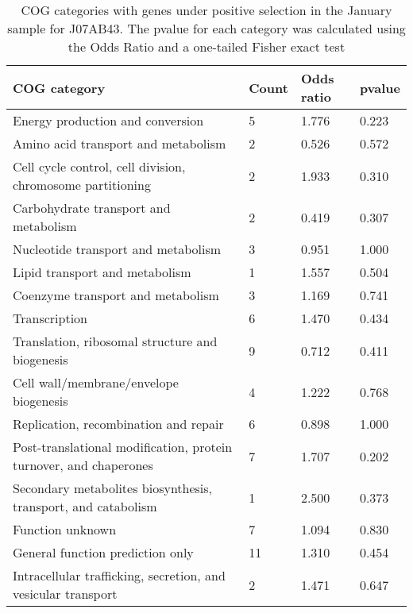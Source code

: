 \begin{table}[]
\footnotesize 
	\tabcolsep=0.11cm 
\caption{COG categories with genes under positive selection in the January sample for J07AB43. The pvalue for each category was calculated using the Odds Ratio and a one-tailed Fisher exact test} 
\begin{tabularx}{\textwidth}{L{6cm}R{2cm}R{2cm}R{2cm}} 
\hline 
\textbf{COG category} & \textbf{Count} & \textbf{Odds ratio} & \textbf{pvalue} \\ 
\hline 
Energy production and conversion & 5 & 1.776 & 0.223 \\ 
Amino acid transport and metabolism & 2 & 0.526 & 0.572 \\ 
Cell cycle control, cell division, chromosome partitioning & 2 & 1.933 & 0.310 \\ 
Carbohydrate transport and metabolism & 2 & 0.419 & 0.307 \\ 
Nucleotide transport and metabolism & 3 & 0.951 & 1.000 \\ 
Lipid transport and metabolism & 1 & 1.557 & 0.504 \\ 
Coenzyme transport and metabolism & 3 & 1.169 & 0.741 \\ 
Transcription & 6 & 1.470 & 0.434 \\ 
Translation, ribosomal structure and biogenesis & 9 & 0.712 & 0.411 \\ 
Cell wall/membrane/envelope biogenesis & 4 & 1.222 & 0.768 \\ 
Replication, recombination and repair & 6 & 0.898 & 1.000 \\ 
Post-translational modification, protein turnover, and chaperones & 7 & 1.707 & 0.202 \\ 
Secondary metabolites biosynthesis, transport, and catabolism & 1 & 2.500 & 0.373 \\ 
Function unknown & 7 & 1.094 & 0.830 \\ 
General function prediction only & 11 & 1.310 & 0.454 \\ 
Intracellular trafficking, secretion, and vesicular transport & 2 & 1.471 & 0.647 \\ 
\end{tabularx} 
\label{January_COG_Selection_J07AB43} 
 \end{table} 

